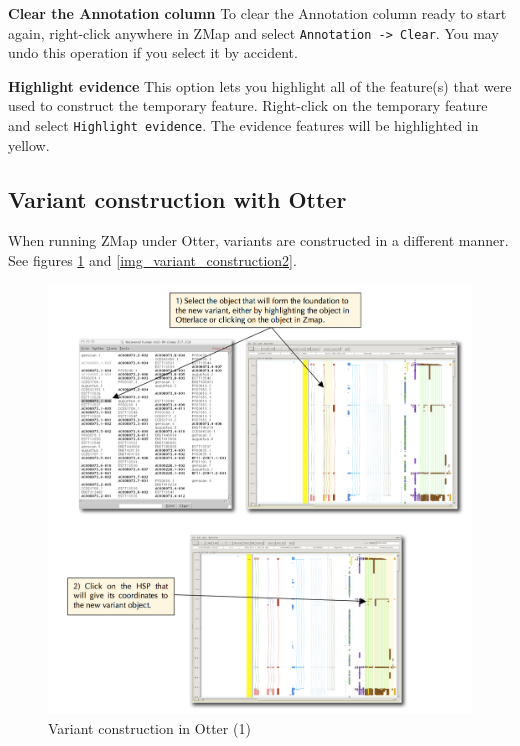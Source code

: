 \documentclass[letterpaper]{article}
\begin{document}
\textbf{Clear the Annotation column}
To clear the Annotation column ready to start again, right-click anywhere in ZMap and select \lstinline{Annotation -> Clear}. You may undo this operation if you select it by accident.

\textbf{Highlight evidence}
This option lets you highlight all of the feature(s) that were used to construct the temporary feature. Right-click on the temporary feature and select \lstinline{Highlight evidence}. The evidence features will be highlighted in yellow.


\subsection{Variant construction with Otter}
When running ZMap under Otter, variants are constructed in a different manner. See figures \ref{img_variant_construction} and \ref{img_variant_construction2}.

\begin{figure}
\centering
\color[rgb]{0.30980393,0.5058824,0.7411765}
\includegraphics[width=15.231cm]{img_variant_construction.png}
\caption{Variant construction in Otter (1)}
\label{img_variant_construction}
\end{figure}
\end{document}
